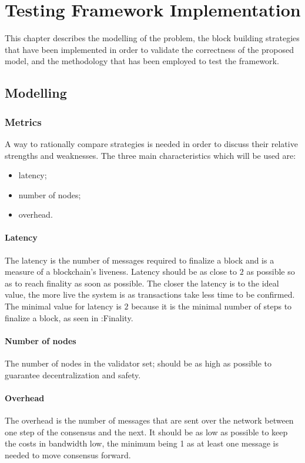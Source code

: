 \chapter{Testing Framework Implementation}
\label{chap:implementation}

This chapter describes the modelling of the problem, the block building
strategies that have been implemented in order to validate the correctness of
the proposed model, and the methodology that has been employed to test the
framework.

\section{Modelling}
\subsection{Metrics}
\FloatBarrier
A way to rationally compare strategies is needed in order to discuss their
relative strengths and weaknesses. The three main characteristics which will be used are:
\begin{itemize}
        \item latency;
        \item number of nodes;
        \item overhead.
\end{itemize}

\subsubsection{Latency}
The latency is the number of messages required to finalize a block and is a
measure of a blockchain's liveness. Latency should be as close to \(2\)
 as possible so as to reach finality as soon as possible. The closer the latency is to the ideal
value, the more live the system is as transactions take less time to be
confirmed. The minimal value for latency is \(2\) because it is the minimal
number of steps to finalize a block, as seen in :Finality.

\subsubsection{Number of nodes}
The number of nodes in the validator set; should be as high as possible to
guarantee decentralization and safety.

\subsubsection{Overhead}
The overhead is the number of messages that are sent over the network between
one step of the consensus and the next. It should be as low as possible to keep
the costs in bandwidth low, the minimum being 1 as at least one message is
needed to move consensus forward.

